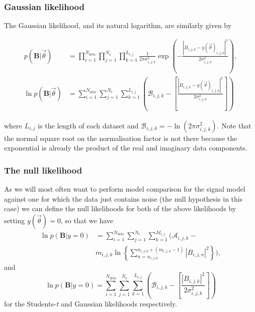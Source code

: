 \subsubsection{Gaussian likelihood}\label{sec:glikelihood}

The Gaussian likelihood, and its natural logarithm, are similarly given by
\begin{widetext}
\begin{align}\label{eq:gausslikelihood}
p(\mathbf{B}|\vec{\theta}) &= \prod_{i=1}^{N_{\text{dets}}} \prod_{j=1}^{N_{\text{s}}} \prod_{k=1}^{L_{i,j}}
\frac{1}{2\pi\sigma_{i,j,k}^2}\exp{\left(-\frac{|B_{i,j,k}-y(\vec{\theta})_{i,j,k}|^2}{2\sigma_{i,j,k}^2}
\right)}, \nonumber \\
\ln{p(\mathbf{B}|\vec{\theta})} &= \sum_{i=1}^{N_{\text{dets}}} \sum_{j=1}^{N_{\text{s}}}
\sum_{k=1}^{L_{i,j}} \left(\mathcal{B}_{i,j,k} -
\left[\frac{|B_{i,j,k}-y(\vec{\theta})_{i,j,k}|^2}{2\sigma_{i,j,k}^2 } \right] \right)
\end{align}
\end{widetext}
where $L_{i,j}$ is the length of each dataset and $\mathcal{B}_{i,j,k} = -\ln{(2\pi\sigma_{i,j,k}^2)}$. Note
that the normal square root on the normalisation factor is not there because the exponential is already the
product of the real and imaginary data components.

\subsubsection{The null likelihood}\label{sec:nulllike}

As we will most often want to perform model comparison for the signal model against one for which the data just contains
noise (the null hypothesis in this case) we can define the null likelihoods for both of the above likelihoods
by setting $y(\vec{\theta}) = 0$, so that we have
\begin{align}\label{eq:nulllike}
\ln{p(\mathbf{B}|y=0)} &= \sum_{i=1}^{N_{\text{dets}}} \sum_{j=1}^{N_{\text{s}}}
\sum_{k=1}^{M_{i,j}} \Bigg( \mathcal{A}_{i,j,k} - \nonumber \\
&m_{i,j,k}\ln{
\left\{\sum_{n=n_{i,j,0}}^{n_{i,j,0}+(m_{i,j,k}-1)} |B_{i,j,n}|^2\right\}}
\Bigg),
\end{align}
and
\begin{equation}
\ln{p(\mathbf{B}|y=0)} = \sum_{i=1}^{N_{\text{dets}}} \sum_{j=1}^{N_{\text{s}}}
\sum_{k=1}^{L_{i,j}} \left(\mathcal{B}_{i,j,k} -
\left[\frac{|B_{i,j,k}|^2}{2\sigma_{i,j,k}^2 } \right] \right)
\end{equation}
for the Students-{\it t} and Gaussian likelihoods respectively.

